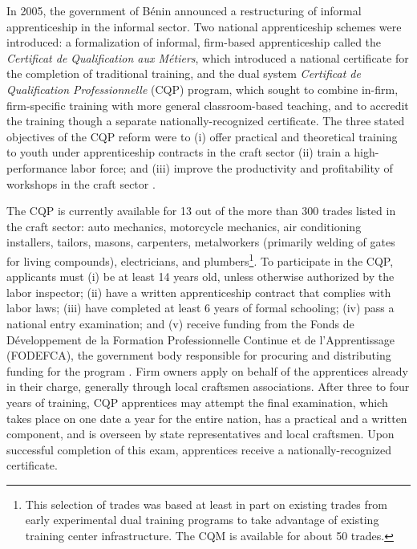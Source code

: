 \documentclass[
  a4paper, twoside, 12pt]{book}
\begin{document}
In 2005, the government of Bénin announced a restructuring of informal apprenticeship in the informal sector. Two national apprenticeship schemes were introduced: a formalization of informal, firm-based apprenticeship called the \emph{Certificat de Qualification aux Métiers}, which introduced a national certificate for the completion of traditional training, and the dual system \emph{Certificat de Qualification Professionnelle} (CQP) program, which sought to combine in-firm, firm-specific training with more general classroom-based teaching, and to accredit the training though a separate nationally-recognized certificate. The three stated objectives of the CQP reform were to (i) offer practical and theoretical training to youth under apprenticeship contracts in the craft sector (ii) train a high-performance labor force; and (iii) improve the productivity and profitability of workshops in the craft sector \autocite{davodoun2011}.

The CQP is currently available for 13 out of the more than 300 trades listed in the craft sector: auto mechanics, motorcycle mechanics, air conditioning installers, tailors, masons, carpenters, metalworkers (primarily welding of gates for living compounds), electricians, and plumbers\footnote{This selection of trades was based at least in part on existing trades from early experimental dual training programs to take advantage of existing training center infrastructure. The CQM is available for about 50 trades.}. To participate in the CQP, applicants must (i) be at least 14 years old, unless otherwise authorized by the labor inspector; (ii) have a written apprenticeship contract that complies with labor laws; (iii) have completed at least 6 years of formal schooling; (iv) pass a national entry examination; and (v) receive funding from the Fonds de Développement de la Formation Professionnelle Continue et de l'Apprentissage (FODEFCA), the government body responsible for procuring and distributing funding for the program \autocite{kofswisseconomicinstitute2017}. Firm owners apply on behalf of the apprentices already in their charge, generally through local craftsmen associations. After three to four years of training, CQP apprentices may attempt the final examination, which takes place on one date a year for the entire nation, has a practical and a written component, and is overseen by state representatives and local craftsmen. Upon successful completion of this exam, apprentices receive a nationally-recognized certificate.
\end{document}
